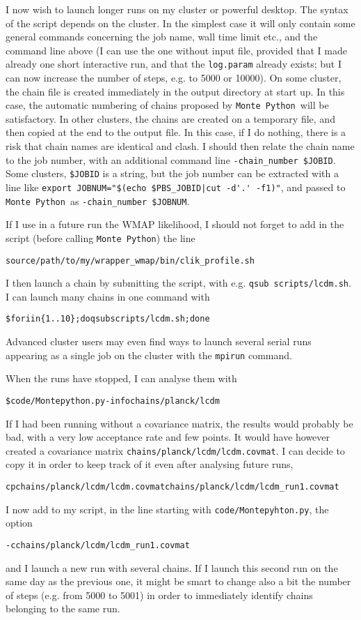 \documentclass[10pt]{article}
\newcommand{\MP}{\texttt{Monte Python}}
\begin{document}
I now wish to launch longer runs on my cluster or powerful desktop. The syntax of the script depends on the cluster. In the simplest case it will only contain some general commands concerning the job name, wall time limit etc., and the command line above (I can use the one without input file, provided that I made already one short interactive run, and that the \verb?log.param? already exists; but I can now increase the number of steps, e.g. to 5000 or 10000). On some cluster, the chain file is created immediately in the output directory at start up. In this case, the automatic numbering of chains proposed by \MP~will be satisfactory. In other clusters, the chains are created on a temporary file, and then copied at the end to the output file. In this case, if I do nothing, there is a risk that chain names are identical and clash. I should then relate the chain name to the job number, with an additional command line \verb?-chain_number $JOBID?. Some clusters, \verb?$JOBID? is a string, but the job number can be extracted with a line like \verb?export JOBNUM="$(echo $PBS_JOBID|cut -d'.' -f1)"?, and passed to \MP~as  \verb?-chain_number $JOBNUM?.

If I use in a future run the WMAP likelihood, I should not forget to add in the script (before calling \MP) the line
\begin{alltt}
source /path/to/my/wrapper_wmap/bin/clik_profile.sh
\end{alltt}

I then launch a chain by submitting the script, with e.g. \verb?qsub scripts/lcdm.sh?. I can launch many chains in one command with
\begin{alltt}
\$ for i in \{1..10\}; do qsub scripts/lcdm.sh;done
\end{alltt} 
Advanced cluster users may even find ways to launch several serial runs appearing as a single job on the cluster with the \verb?mpirun? command.

When the runs have stopped, I can analyse them with
\begin{alltt}
\$ code/Montepython.py -info chains/planck/lcdm 
\end{alltt}
If I had been running without a covariance matrix, the results would probably
be bad, with a very low acceptance rate and few points. It would have however
created a covariance matrix \verb?chains/planck/lcdm/lcdm.covmat?. I can decide
to copy it in order to keep track of it even after analysing future runs, 
\begin{alltt}
cp chains/planck/lcdm/lcdm.covmat chains/planck/lcdm/lcdm_run1.covmat
\end{alltt}
I now add to my script, in the line starting with \verb?code/Montepyhton.py?, the option 
\begin{alltt}
-c chains/planck/lcdm/lcdm_run1.covmat
\end{alltt} and I launch a new run with several chains. If I launch this second
run on the same day as the previous one, it might be smart to change also a bit
the number of steps (e.g. from 5000 to 5001) in order to immediately identify
chains belonging to the same run.
\end{document}
